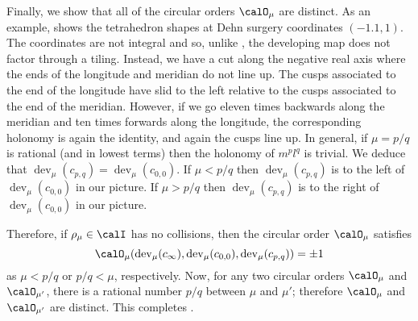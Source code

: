 \documentclass[12pt]{amsart}
\newcommand{\dev}{\operatorname{dev}}
\begin{document}
\begin{example}
Finally, we show that all of the circular orders $\calO_\mu$ are distinct.  As an example,  shows the tetrahedron shapes at Dehn surgery coordinates $(-1.1,1)$.  The coordinates are not integral and so, unlike , the developing map does not factor through a tiling.  Instead, we have a cut along the negative real axis where the ends of the longitude and meridian do not line up.  The cusps associated to the end of the longitude have slid to the left relative to the cusps associated to the end of the meridian.  However, if we go eleven times backwards along the meridian and ten times forwards along the longitude, the corresponding holonomy is again the identity, and again the cusps line up.  In general, if $\mu = p/q$ is rational (and in lowest terms) then the holonomy of $m^p l^q$ is trivial.  We deduce that $\dev_\mu(c_{p,q}) = \dev_\mu(c_{0,0})$.  If $\mu < p/q$ then $\dev_\mu(c_{p,q})$ is to the left of $\dev_\mu(c_{0,0})$ in our picture.  If $\mu > p/q$ then $\dev_\mu(c_{p,q})$ is to the right of $\dev_\mu(c_{0,0})$ in our picture.

Therefore, if $\rho_\mu \in \calI$ has no collisions, then the circular order $\calO_\mu$ satisfies 
\[
\calO_\mu(\dev_\mu(c_\infty), \dev_\mu(c_{0,0}), \dev_\mu(c_{p,q})) = \pm 1
\]
as $\mu < p/q$ or $p/q < \mu$, respectively.  
Now, for any two circular orders $\calO_\mu$ and $\calO_{\mu'}$, there is a rational number $p/q$ between $\mu$ and $\mu'$; therefore $\calO_\mu$ and $\calO_{\mu'}$ are distinct.  This completes . 
\end{example}
\end{document}

